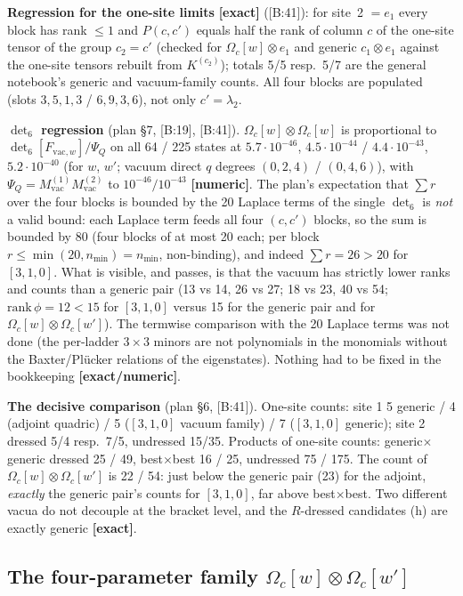 \documentclass[10pt]{article}
\newcommand{\cl}[2]{\textsf{[#1:#2]}}
\newcommand{\tg}[1]{\textbf{[#1]}}
\newcommand{\Om}{\Omega}
\newcommand{\vac}{\mathrm{vac}}
\begin{document}
\textbf{Regression for the one-site limits} \tg{exact} (\cl{B}{41}): for site~2 $=e_1$ every block has rank $\le1$ and $P(c,c')$ equals half the rank of column $c$ of the one-site tensor of the group $c_2=c'$ (checked for $\Om_c[w]\otimes e_1$ and generic $c_1\otimes e_1$ against the one-site tensors rebuilt from $K^{(c_2)}$); totals 5/5 resp.\ 5/7 are the general notebook's generic and vacuum-family counts. All four blocks are populated (slots $3,5,1,3$ / $6,9,3,6$), not only $c'=\lambda_2$.

\textbf{$\det_6$ regression} (plan \S7, \cl{B}{19}, \cl{B}{41}). $\Om_c[w]\otimes\Om_c[w]$ is proportional to $\det_6[F_{\vac,w}]/\Psi_Q$ on all 64 / 225 states at $5.7\cdot10^{-46}$, $4.5\cdot10^{-44}$ / $4.4\cdot10^{-43}$, $5.2\cdot10^{-40}$ (for $w$, $w'$; vacuum direct $q$ degrees $(0,2,4)$ / $(0,4,6)$), with $\Psi_Q=M^{(1)}_\vac M^{(2)}_\vac$ to $10^{-46}/10^{-43}$ \tg{numeric}. The plan's expectation that $\sum r$ over the four blocks is bounded by the 20 Laplace terms of the single $\det_6$ is \emph{not} a valid bound: each Laplace term feeds all four $(c,c')$ blocks, so the sum is bounded by 80 (four blocks of at most 20 each; per block $r\le\min(20,n_{\min})=n_{\min}$, non-binding), and indeed $\sum r=26>20$ for $[3,1,0]$. What is visible, and passes, is that the vacuum has strictly lower ranks and counts than a generic pair (13 vs 14, 26 vs 27; 18 vs 23, 40 vs 54; $\mathrm{rank}\,\phi=12<15$ for $[3,1,0]$ versus 15 for the generic pair and for $\Om_c[w]\otimes\Om_c[w']$). The termwise comparison with the 20 Laplace terms was not done (the per-ladder $3\times3$ minors are not polynomials in the monomials without the Baxter/Pl\"ucker relations of the eigenstates). Nothing had to be fixed in the bookkeeping \tg{exact/numeric}.

\textbf{The decisive comparison} (plan \S6, \cl{B}{41}). One-site counts: site 1 5 generic / 4 (adjoint quadric) / 5 ($[3,1,0]$ vacuum family) / 7 ($[3,1,0]$ generic); site 2 dressed 5/4 resp.\ 7/5, undressed 15/35. Products of one-site counts: generic$\times$generic dressed 25 / 49, best$\times$best 16 / 25, undressed 75 / 175. The count of $\Om_c[w]\otimes\Om_c[w']$ is 22 / 54: just below the generic pair (23) for the adjoint, \emph{exactly} the generic pair's counts for $[3,1,0]$, far above best$\times$best. Two different vacua do not decouple at the bracket level, and the $R$-dressed candidates (h) are exactly generic \tg{exact}.

\subsection{The four-parameter family $\Om_c[w]\otimes\Om_c[w']$}\label{sec:Bfamily}
\end{document}
